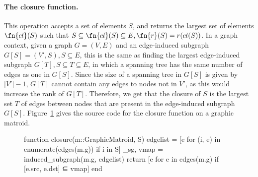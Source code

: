 \paragraph{The closure function.} This operation accepts a set of elements $S$, and returns the largest set of elements $\fn{cl}(S)$ such that $S \subseteq \fn{cl}(S) \subseteq E, \fn{r}(S) = r(cl(S))$. In a graph context, given a graph $G=(V,E)$ and an edge-induced subgraph $G[S] = (V', S), S\subseteq E$, this is the same as finding the largest edge-induced subgraph $G[T], S\subseteq T\subseteq E$, in which a spanning tree has the same number of edges as one in $G[S]$. Since the size of a spanning tree in $G[S]$ is given by $|V'|-1$, $G[T]$ cannot contain any edges to nodes not in $V'$, as this would increase the rank of $G[T]$. Therefore, we get that the closure of $S$ is the largest set $T$ of edges between nodes that are present in the edge-induced subgraph $G[S]$. Figure~\ref{code:closure_graphic} gives the source code for the closure function on a graphic matroid.
\begin{figure}[ht!]
\begin{jllisting}
function closure(m::GraphicMatroid, S)
  edgelist = [e for (i, e) in enumerate(edges(m.g)) if i in S]
  _sg, vmap = induced_subgraph(m.g, edgelist)
  return [e for e in edges(m.g) if [e.src, e.dst] ⊆ vmap]
end
\end{jllisting}
\caption{}
\label{code:closure_graphic}
\end{figure}


